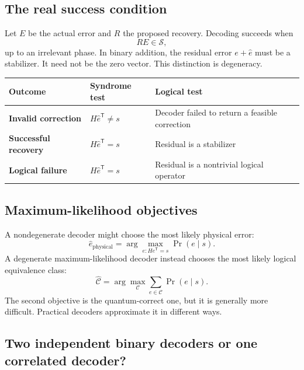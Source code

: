 \documentclass[11pt,letterpaper]{article}
\begin{document}
\subsection{The real success condition}

Let $E$ be the actual error and $R$ the proposed recovery. Decoding succeeds when
\begin{equation}
  RE\in\mathcal S,
  \label{eq:logical-success}
\end{equation}
up to an irrelevant phase. In binary addition, the residual error $e+\hat e$ must be a stabilizer.
It need not be the zero vector. This distinction is degeneracy.

\begin{center}
\begin{tabularx}{\textwidth}{>{\bfseries}p{} X X}
\toprule
Outcome & Syndrome test & Logical test \\
\midrule
Invalid correction & $H\hat e^{\mathsf T}\ne s$ & Decoder failed to return a feasible correction \\
Successful recovery & $H\hat e^{\mathsf T}=s$ & Residual is a stabilizer \\
Logical failure & $H\hat e^{\mathsf T}=s$ & Residual is a nontrivial logical operator \\
\bottomrule
\end{tabularx}
\end{center}

\subsection{Maximum-likelihood objectives}

A nondegenerate decoder might choose the most likely physical error:
\begin{equation}
  \hat e_{\mathrm{physical}}=\arg\max_{e:He^{\mathsf T}=s}\Pr(e\mid s).
\end{equation}
A degenerate maximum-likelihood decoder instead chooses the most likely logical equivalence class:
\begin{equation}
  \hat{\mathcal C}=\arg\max_{\mathcal C}\sum_{e\in\mathcal C}\Pr(e\mid s).
\end{equation}
The second objective is the quantum-correct one, but it is generally more difficult. Practical
decoders approximate it in different ways.

\subsection{Two independent binary decoders or one correlated decoder?}
\end{document}
